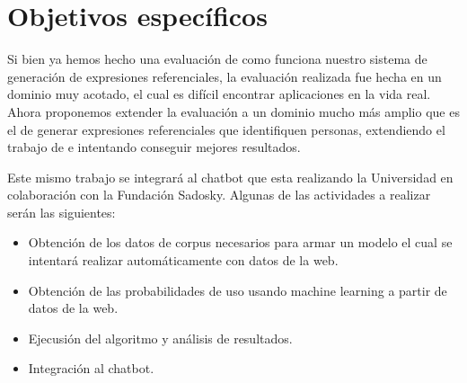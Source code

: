 \section{Objetivos espec\'ificos}
\label{objetivos}

Si bien ya hemos hecho una evaluaci\'on de como funciona nuestro sistema de generaci\'on de expresiones referenciales, la evaluaci\'on realizada 
fue hecha en un dominio muy acotado, el cual es dif\'icil encontrar aplicaciones en la vida real. Ahora proponemos
extender la evaluaci\'on a un dominio mucho m\'as amplio que es el de generar expresiones referenciales que identifiquen personas, extendiendo el
trabajo de \cite{PachecoDuboue} e intentando conseguir mejores resultados.

Este mismo trabajo se integrar\'a al chatbot que esta realizando la Universidad en colaboraci\'on con la Fundaci\'on Sadosky.
Algunas de las actividades a realizar ser\'an las siguientes:
\begin{itemize}

\item Obtenci\'on de los datos de corpus necesarios para armar un modelo el cual se intentar\'a realizar autom\'aticamente con datos de la web.
\item Obtenci\'on de las probabilidades de uso usando machine learning a partir de datos de la web.
\item Ejecusi\'on del algoritmo y an\'alisis de resultados.
\item Integraci\'on al chatbot.
\end{itemize}

